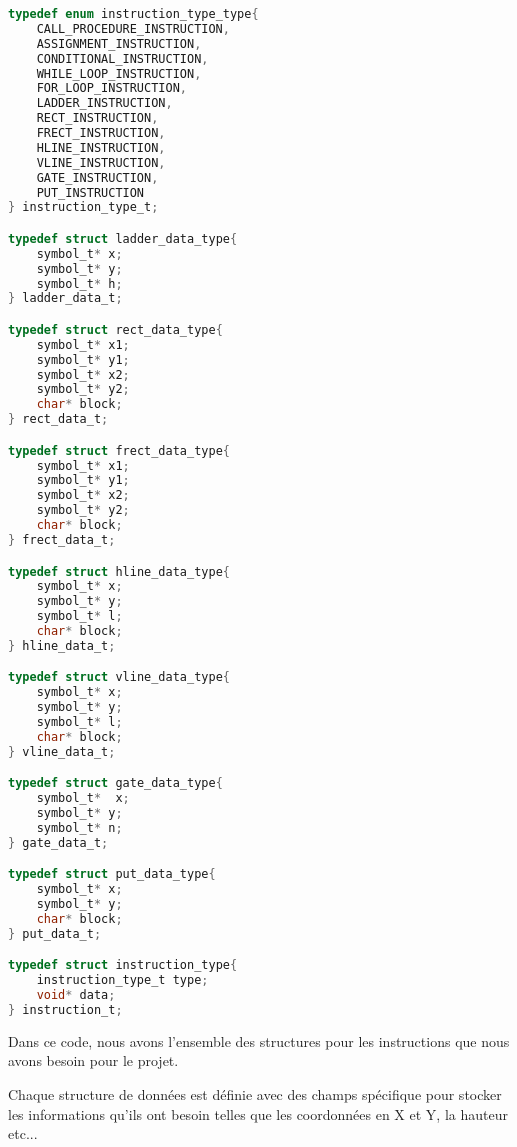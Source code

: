 \lstset{style=mystyle}
\begin{lstlisting}[language=C, caption=Structure pour une instruction]
typedef enum instruction_type_type{
    CALL_PROCEDURE_INSTRUCTION,
    ASSIGNMENT_INSTRUCTION,
    CONDITIONAL_INSTRUCTION,
    WHILE_LOOP_INSTRUCTION,
    FOR_LOOP_INSTRUCTION,
    LADDER_INSTRUCTION,
    RECT_INSTRUCTION,
    FRECT_INSTRUCTION,
    HLINE_INSTRUCTION,
    VLINE_INSTRUCTION,
    GATE_INSTRUCTION,
    PUT_INSTRUCTION
} instruction_type_t;

typedef struct ladder_data_type{
    symbol_t* x;
    symbol_t* y;
    symbol_t* h;
} ladder_data_t;

typedef struct rect_data_type{
    symbol_t* x1;
    symbol_t* y1;
    symbol_t* x2;
    symbol_t* y2;
    char* block;
} rect_data_t;

typedef struct frect_data_type{
    symbol_t* x1;
    symbol_t* y1;
    symbol_t* x2;
    symbol_t* y2;
    char* block;
} frect_data_t;

typedef struct hline_data_type{
    symbol_t* x;
    symbol_t* y;
    symbol_t* l;
    char* block;
} hline_data_t;

typedef struct vline_data_type{
    symbol_t* x;
    symbol_t* y;
    symbol_t* l;
    char* block;
} vline_data_t;

typedef struct gate_data_type{
    symbol_t*  x;
    symbol_t* y;
    symbol_t* n;
} gate_data_t;

typedef struct put_data_type{
    symbol_t* x;
    symbol_t* y;
    char* block;
} put_data_t;

typedef struct instruction_type{
    instruction_type_t type;
    void* data;
} instruction_t;
\end{lstlisting}

Dans ce code, nous avons l'ensemble des structures pour les instructions que nous avons besoin pour le projet.

Chaque structure de données est définie avec des champs spécifique pour stocker les informations qu'ils ont besoin telles que les coordonnées en X et Y, la hauteur etc...

\newpage